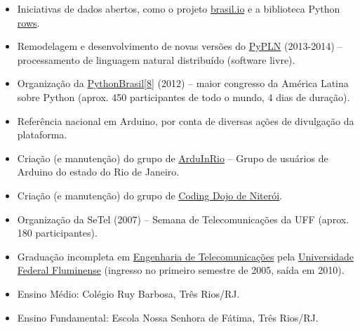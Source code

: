 \documentclass[a4paper,11pt]{article}
\begin{document}
	\begin{itemize}
		\item Iniciativas de dados abertos, como o projeto
			\href{http://brasil.io/}{brasil.io} e a
			biblioteca Python \href{https://github.com/turicas/rows}{rows}.
		\item Remodelagem e desenvolvimento de novas versões do
			\href{http://pypln.org/}{PyPLN} (2013-2014) -- processamento de
			linguagem natural distribuído (software livre).
		\item Organização da
			\href{http://2012.pythonbrasil.org.br/}{PythonBrasil[8]} (2012) --
			maior congresso da América Latina sobre Python (aprox. 450
			participantes de todo o mundo, 4 dias de duração).
		\item Referência nacional em Arduino, por conta de diversas ações de
			divulgação da plataforma.
		\item Criação (e manutenção) do grupo de
			\href{https://groups.google.com/forum/#!forum/arduinrio}{ArduInRio}
			-- Grupo de usuários de Arduino do estado do Rio de Janeiro.
		\item Criação (e manutenção) do grupo de
			\href{http://dojorio.org}{Coding Dojo de Niterói}.
		\item Organização da SeTel (2007) -- Semana de Telecomunicações da UFF
			(aprox. 180 participantes).
	 \end{itemize}


	\begin{itemize}
		\item Graduação incompleta em \href{http://telecom.uff.br/}{Engenharia
			de Telecomunicações} pela \href{http://www.uff.br/}{Universidade
			Federal Fluminense} (ingresso no primeiro semestre de 2005, saída
			em 2010).
		\item Ensino Médio: Colégio Ruy Barbosa, Três Rios/RJ.
		\item Ensino Fundamental: Escola Nossa Senhora de Fátima, Três Rios/RJ.
	 \end{itemize}
\end{document}
